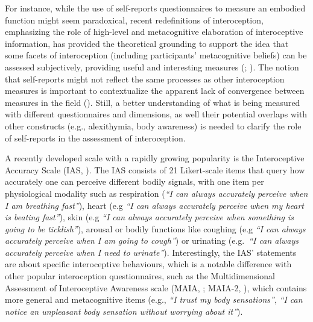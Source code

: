 \documentclass[
  man,
  floatsintext,
  longtable,
  nolmodern,
  notxfonts,
  notimes,
  colorlinks=true,linkcolor=blue,citecolor=blue,urlcolor=blue]{apa7}
\begin{document}
For instance, while the use of self-reports questionnaires to measure an
embodied function might seem paradoxical, recent redefinitions of
interoception, emphasizing the role of high-level and metacognitive
elaboration of interoceptive information, has provided the theoretical
grounding to support the idea that some facets of interoception
(including participants' metacognitive beliefs) can be assessed
subjectively, providing useful and interesting measures
(;
). The notion that
self-reports might not reflect the same processes as other interoception
measures is important to contextualize the apparent lack of convergence
between measures in the field
(). Still, a
better understanding of what is being measured with different
questionnaires and dimensions, as well their potential overlaps with
other constructs (e.g., alexithymia, body awareness) is needed to
clarify the role of self-reports in the assessment of interoception.

A recently developed scale with a rapidly growing popularity is the
Interoceptive Accuracy Scale (IAS, ). The IAS consists of 21 Likert-scale items that query how
accurately one can perceive different bodily signals, with one item per
physiological modality such as respiration (\emph{``I can always
accurately perceive when I am breathing fast''}), heart (e.g \emph{``I
can always accurately perceive when my heart is beating fast''}), skin
(e.g \emph{``I can always accurately perceive when something is going to
be ticklish''}), arousal or bodily functions like coughing (e.g
\emph{``I can always accurately perceive when I am going to cough''}) or
urinating (e.g.~\emph{``I can always accurately perceive when I need to
urinate''}). Interestingly, the IAS' statements are about specific
interoceptive behaviours, which is a notable difference with other
popular interoception questionnaires, such as the Multidimensional
Assessment of Interoceptive Awareness scale (MAIA,
; MAIA-2,
), which
contains more general and metacognitive items (e.g., \emph{``I trust my
body sensations''}, \emph{``I can notice an unpleasant body sensation
without worrying about it''}).
\end{document}

